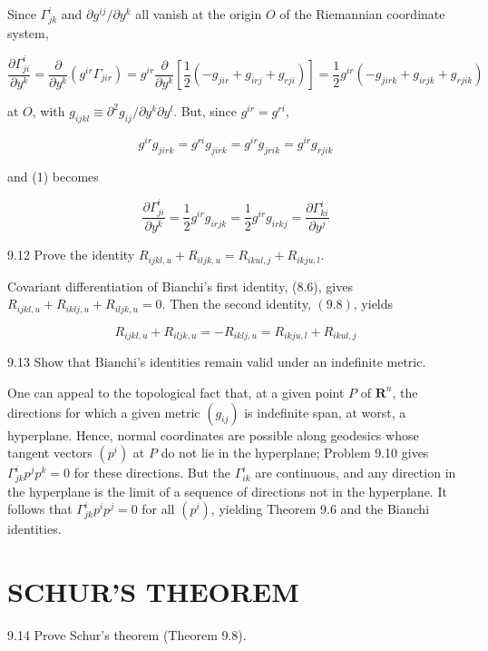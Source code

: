 \documentclass[10pt]{article}
\begin{document}
Since $\Gamma_{j k}^{i}$ and $\partial g^{i j} / \partial y^{k}$ all vanish at the origin $O$ of the Riemannian coordinate system,


\begin{equation*}
\frac{\partial \Gamma_{j i}^{i}}{\partial y^{k}}=\frac{\partial}{\partial y^{k}}\left(g^{i r} \Gamma_{j i r}\right)=g^{i r} \frac{\partial}{\partial y^{k}}\left[\frac{1}{2}\left(-g_{j i r}+g_{i r j}+g_{r j i}\right)\right]=\frac{1}{2} g^{i r}\left(-g_{j i r k}+g_{i r j k}+g_{r j i k}\right) \tag{1}
\end{equation*}


at $O$, with $g_{i j k l} \equiv \partial^{2} g_{i j} / \partial y^{k} \partial y^{l}$. But, since $g^{i r}=g^{r i}$,

$$
g^{i r} g_{j i r k}=g^{r i} g_{j i r k}=g^{i r} g_{j r i k}=g^{i r} g_{r j i k}
$$

and (1) becomes

$$
\frac{\partial \Gamma_{j i}^{i}}{\partial y^{k}}=\frac{1}{2} g^{i r} g_{i r j k}=\frac{1}{2} g^{i r} g_{i r k j}=\frac{\partial \Gamma_{k i}^{i}}{\partial y^{j}}
$$

9.12 Prove the identity $R_{i j k l, u}+R_{i l j k, u}=R_{i k u l, j}+R_{i k j u, l}$.

Covariant differentiation of Bianchi's first identity, (8.6), gives $R_{i j k l, u}+R_{i k l j, u}+R_{i l j k, u}=0$. Then the second identity, $(9.8)$, yields

$$
R_{i j k l, u}+R_{i l j k, u}=-R_{i k l j, u}=R_{i k j u, l}+R_{i k u l, j}
$$

9.13 Show that Bianchi's identities remain valid under an indefinite metric.

One can appeal to the topological fact that, at a given point $P$ of $\mathbf{R}^{n}$, the directions for which a given metric $\left(g_{i j}\right)$ is indefinite span, at worst, a hyperplane. Hence, normal coordinates are possible along geodesics whose tangent vectors $\left(p^{i}\right)$ at $P$ do not lie in the hyperplane; Problem 9.10 gives $\Gamma_{j k}^{i} p^{j} p^{k}=0$ for these directions. But the $\Gamma_{i k}^{i}$ are continuous, and any direction in the hyperplane is the limit of a sequence of directions not in the hyperplane. It follows that $\Gamma_{j k}^{i} p^{i} p^{j}=0$ for all $\left(p^{i}\right)$, yielding Theorem 9.6 and the Bianchi identities.

\section*{SCHUR'S THEOREM}
9.14 Prove Schur's theorem (Theorem 9.8).
\end{document}

